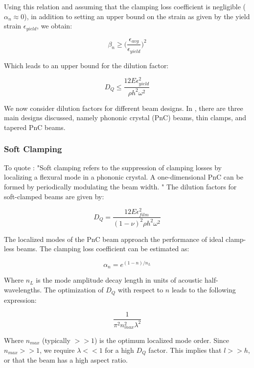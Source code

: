 \documentclass[%
 reprint,
nofootinbib,
 amsmath,amssymb,
 aps,
]{revtex4-2}
\begin{document}
Using this relation and assuming that the clamping loss coefficient is negligible ($\alpha_n \approx 0$), in addition to setting an upper bound on the strain as given by the yield strain $\epsilon_{yield}$, we obtain:

\begin{equation*}
    \beta_n \geq \Big ( \frac{\epsilon_{avg}}{\epsilon_{yield}} \Big ) ^2
\end{equation*}

Which leads to an upper bound for the dilution factor:

\begin{equation*}
    D_Q \leq \frac{12 E \epsilon^{2}_{yield}}{\rho h^2 \omega^2}
\end{equation*}

We now consider dilution factors for different beam designs. In \cite{generalized_dissipation_dilution}, there are three main designs discussed, namely phononic crystal (PnC) beams, thin clamps, and tapered PnC beams. 

\subsubsection{Soft Clamping}
To quote \cite{generalized_dissipation_dilution}:
"Soft clamping refers to the suppression of clamping losses by localizing a flexural mode in a phononic crystal. A one-dimensional PnC can be formed by periodically modulating the beam width. " The dilution factors for soft-clamped beams are given by:

\begin{equation*}
    D_Q = \frac{12E {\epsilon}_{film}^2}{(1-\nu)^2 \rho h^2 \omega^2}
\end{equation*}

The localized modes of the PnC beam approach the performance of ideal clamp-less beams. The clamping loss coefficient can be estimated as:

\begin{equation*}
    \alpha_n = e^{(1-n)/n_L}
\end{equation*}

Where $n_L$ is the mode amplitude decay length in units of acoustic half-wavelengths. The optimization of $D_Q$ with respect to $n$ leads to the following expression:

\begin{equation*}
    \frac{1}{\pi^2 n^{2}_{max} \lambda^2}
\end{equation*}

Where $n_{max}$ (typically $>>1$) is the optimum localized mode order. Since $n_{max}>>1$, we require $\lambda<<1$ for a high $D_Q$ factor. This implies that $l>>h$, or that the beam has a high aspect ratio.
\end{document}
